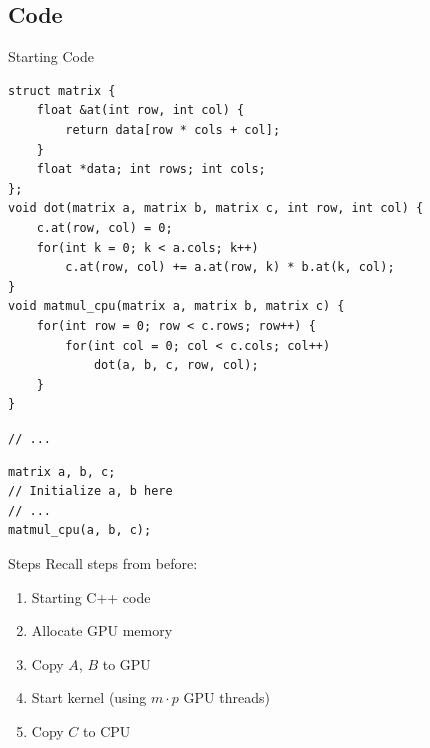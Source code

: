 \subsection{Code}\label{subsec:code}
\begin{frame}[fragile]{Starting Code}
    \begin{verbatim}
struct matrix {
    float &at(int row, int col) {
        return data[row * cols + col];
    }
    float *data; int rows; int cols;
};
void dot(matrix a, matrix b, matrix c, int row, int col) {
    c.at(row, col) = 0;
    for(int k = 0; k < a.cols; k++)
        c.at(row, col) += a.at(row, k) * b.at(k, col);
}
void matmul_cpu(matrix a, matrix b, matrix c) {
    for(int row = 0; row < c.rows; row++) {
        for(int col = 0; col < c.cols; col++)
            dot(a, b, c, row, col);
    }
}
    \end{verbatim}
    \texttt{// ...}
    \begin{verbatim}
matrix a, b, c;
// Initialize a, b here
// ...
matmul_cpu(a, b, c);
    \end{verbatim}
\end{frame}

\begin{frame}{Steps}
    Recall steps from before:
    \begin{enumerate}
        \item<+-> Starting C++ code
        \item<+-> Allocate GPU memory
        \item<+-> Copy $A$, $B$ to GPU
        \item<+-> Start kernel (using $m \cdot p$ GPU threads)
        \item<+-> Copy $C$ to CPU
    \end{enumerate}
\end{frame}

